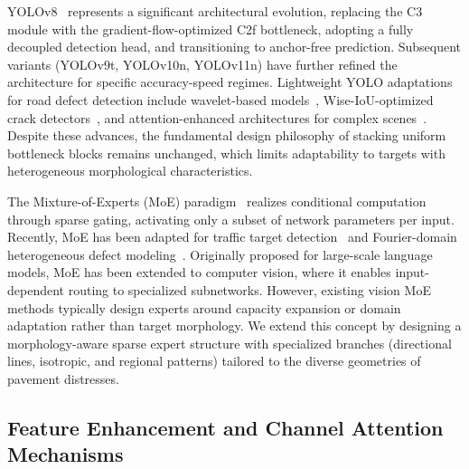\documentclass{ieeeaccess}
\begin{document}
YOLOv8~\cite{kothai2024survey} represents a significant architectural evolution, replacing the C3 module with the gradient-flow-optimized C2f bottleneck, adopting a fully decoupled detection head, and transitioning to anchor-free prediction. Subsequent variants (YOLOv9t, YOLOv10n, YOLOv11n) have further refined the architecture for specific accuracy-speed regimes. Lightweight YOLO adaptations for road defect detection include wavelet-based models~\cite{wang2025moeod}, Wise-IoU-optimized crack detectors~\cite{sensors2026directional}, and attention-enhanced architectures for complex scenes~\cite{han2024msyolo}. Despite these advances, the fundamental design philosophy of stacking uniform bottleneck blocks remains unchanged, which limits adaptability to targets with heterogeneous morphological characteristics.

The Mixture-of-Experts (MoE) paradigm~\cite{oksuz2024mocae, lu2025dynamicdino} realizes conditional computation through sparse gating, activating only a subset of network parameters per input. Recently, MoE has been adapted for traffic target detection~\cite{wang2025moeod} and Fourier-domain heterogeneous defect modeling~\cite{zhang2026fouriermoee}. Originally proposed for large-scale language models, MoE has been extended to computer vision, where it enables input-dependent routing to specialized subnetworks. However, existing vision MoE methods typically design experts around capacity expansion or domain adaptation rather than target morphology. We extend this concept by designing a morphology-aware sparse expert structure with specialized branches (directional lines, isotropic, and regional patterns) tailored to the diverse geometries of pavement distresses.

\subsection{Feature Enhancement and Channel Attention Mechanisms}
\end{document}
